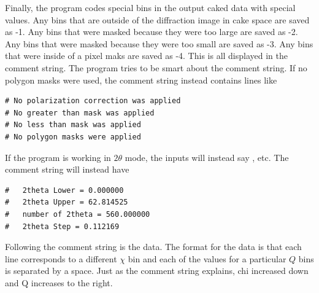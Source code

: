 Finally, the program codes special bins in the output caked data
with special values. Any bins that are outside of the diffraction
image in cake space are saved as -1. Any bins that were masked
because they were too large are saved as -2. Any bins that
were masked because they were too small are saved as -3. Any bins 
that were inside of a pixel maks are saved as -4. This is all
displayed in the comment string. The program tries to be smart about
the comment string. If no polygon masks were used, the comment string
instead contains lines like
\begin{lstlisting}[caption={'Alternate comment string'}]
# No polarization correction was applied
# No greater than mask was applied
# No less than mask was applied
# No polygon masks were applied
\end{lstlisting}
If the program is working in $2\theta$ mode, the inputs will instead 
say , etc. The comment string will instead have
\begin{lstlisting}[caption={'Alternate comment string'}]
#   2theta Lower = 0.000000
#   2theta Upper = 62.814525
#   number of 2theta = 560.000000
#   2theta Step = 0.112169
\end{lstlisting}
Following the comment string is the data. The format for the data is
that each line corresponds to a different $\chi$ bin and each of the 
values for a particular $Q$ bins is separated by a space. Just
as the comment string explains, chi increased down and Q increases to 
the right. 



